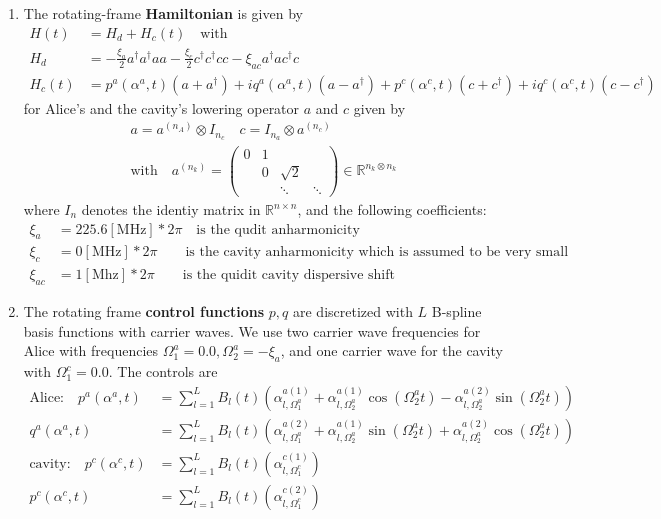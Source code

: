 \documentclass[letterpaper]{article}
\newcommand{\R}{\mathds{R}}
\begin{document}
\begin{enumerate}
  \item The rotating-frame \textbf{Hamiltonian} is given by 
    \begin{align}
        H(t) &= H_d + H_c(t) \quad \text{with} \\
        H_d  &= -\frac{\xi_a}{2} a^\dagger a^\dagger a a - \frac{\xi_c}{2} c^\dagger c^\dagger c c - \xi_{ac} a^\dagger a c^\dagger c \\ 
        H_c(t) &= p^a(\alpha^a,t) (a+a^\dagger) + iq^a(\alpha^a, t)(a-a^\dagger) + p^c(\alpha^c,t)(c+c^\dagger) + iq^c(\alpha^c,t)(c-c^\dagger)
    \end{align}
    for Alice's and the cavity's lowering operator $a$ and $c$ given by 
    \begin{align}
        a = a^{(n_A)} \otimes I_{n_c} \quad c = I_{n_a} \otimes a^{(n_c)}  \\
        \text{with} \quad a^{(n_k)} = \begin{pmatrix} 0 & 1 & \\ & 0 & \sqrt{2} & \\ & & \ddots  & \ddots \end{pmatrix} \in \R^{n_k\otimes n_k}
    \end{align}
    where $I_n$ denotes the identiy matrix in $\R^{n\times n}$, and the following coefficients:
    \begin{align}
        \xi_a &= 225.6 [\text{MHz}] * 2\pi \quad \text{is the qudit anharmonicity} \\
        \xi_c &= 0 [\text{MHz}] * 2\pi  \quad \quad\text{is the cavity anharmonicity which is assumed to be very small} \\
        \xi_{ac} &= 1 [\text{Mhz}] * 2\pi \quad \quad\text{is the quidit cavity dispersive shift}
    \end{align}

  \item The rotating frame \textbf{control functions} $p,q$ are discretized with $L$ B-spline basis functions with carrier waves. We use two carrier wave frequencies for Alice with frequencies $\Omega^a_1 = 0.0, \Omega^a_2 = -\xi_a$, and one carrier wave for the cavity with $\Omega^c_1 = 0.0$. The controls are 
   \begin{align}
       \text{Alice:} \quad p^a(\alpha^a,t) &= \sum_{l=1}^L B_l(t) \left(\alpha^{a(1)}_{l,\Omega^a_1} + \alpha^{a(1)}_{l,\Omega^a_2}\cos(\Omega^a_2 t) - \alpha^{a(2)}_{l,\Omega^a_2}\sin(\Omega^a_2 t) \right)\\
       q^a(\alpha^a,t) &= \sum_{l=1}^L B_l(t) \left(\alpha^{a(2)}_{l,\Omega^a_1} + \alpha^{a(1)}_{l,\Omega^a_2}\sin(\Omega^a_2 t) + \alpha^{a(2)}_{l,\Omega^a_2}\cos(\Omega^a_2 t) \right) \\
       \text{cavity:} \quad p^c(\alpha^c,t) &= \sum_{l=1}^L B_l(t) \left( \alpha^{c(1)}_{l,\Omega^c_1} \right) \\
       p^c(\alpha^c,t) &= \sum_{l=1}^L B_l(t) \left( \alpha^{c(2)}_{l,\Omega^c_1} \right) 
   \end{align}


\end{enumerate}
\end{document}

